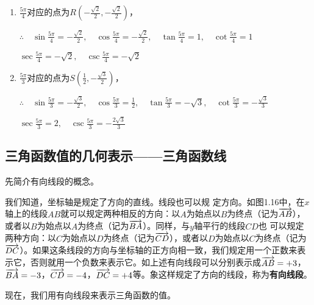 \begin{solution}
\begin{enumerate}[(1)]
\item $\frac{5\pi}{4}$对应的点为$R\left(-\frac{\sqrt{2}}{2},-\frac{\sqrt{2}}{2}\right)$，

$\therefore\quad \sin\frac{5\pi}{4}=-\frac{\sqrt{2}}{2},\quad \cos\frac{5\pi}{4}=-\frac{\sqrt{2}}{2},\quad \tan\frac{5\pi}{4}=1,\quad \cot\frac{5\pi}{4}=1$

$\sec\frac{5\pi}{4}=-\sqrt{2},\quad \csc\frac{5\pi}{4}=-\sqrt{2}$

\item $\frac{5\pi}{3}$对应的点为$S\left(\frac{1}{2},-\frac{\sqrt{3}}{2}\right)$，

$\therefore\quad \sin\frac{5\pi}{3}=-\frac{\sqrt{3}}{2},\quad \cos\frac{5\pi}{3}=\frac{1}{2},\quad \tan\frac{5\pi}{3}=-\sqrt{3},\quad \cot\frac{5\pi}{3}=-\frac{\sqrt{3}}{3}$

$\sec\frac{5\pi}{3}=2,\quad \csc\frac{5\pi}{3}=-\frac{2\sqrt{3}}{3}$
\end{enumerate}    
\end{solution}

\subsection{三角函数值的几何表示——三角函数线}
先简介有向线段的概念。

我们知道，坐标轴是规定了方向的直线。线段也可以规
定方向。如图1.16中，在$x$轴上的线段$AB$就可以规定两种相反的方向：以$A$为始点以$B$为终点（记为$\overrightarrow{AB}$），或者以$B$为始点以$A$为终点（记为$\overrightarrow{BA}$）。同样，与$y$轴平行的线段$CD$也
可以规定两种方向：以$C$为始点以$D$为终点（记为$\overrightarrow{CD}$），或者以$D$为始点以$C$为终点（记为$\overrightarrow{DC}$）。如果这条线段的方向与坐标轴的正方向相一致，我们规定用一个正数来表示它，否则就用一个负数来表示它。如上述有向线段可以分别表示成$\overrightarrow{AB}=+3$，$\overrightarrow{BA}=-3$，$\overrightarrow{CD}=-4$，$\overrightarrow{DC}=+4$等。象这样规定了方向的线段，称为\textbf{有向线段}。

现在，我们用有向线段来表示三角函数的值。

